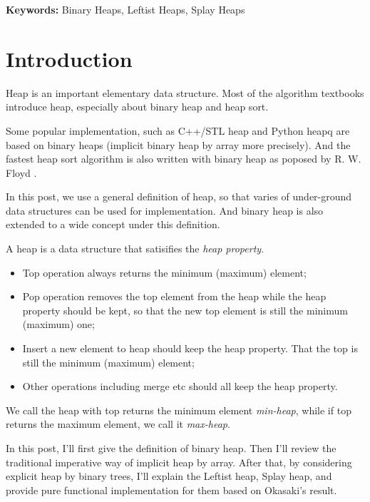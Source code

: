\documentclass{article}
\begin{document}
\vspace{3cm}
{\bfseries Keywords:} Binary Heaps, Leftist Heaps, Splay Heaps


\maketitle

\section{Introduction}
\label{introduction}

Heap is an important elementary data structure. Most of the algorithm
textbooks introduce heap, especially about binary heap and heap sort.

Some popular implementation, such as C++/STL heap and Python heapq
are based on binary heaps (implicit binary heap by array
more precisely). And the fastest heap sort algorithm is also
written with binary heap as poposed by R. W. Floyd
\cite{wiki-heapsort} \cite{rosetta-heapsort}.

In this post, we use a general definition of heap, so that
varies of under-ground data structures can be used for implementation.
And binary heap is also extended to a wide concept under this definition.

A heap is a data structure that satisifies the {\em heap property}.
\begin{itemize}
\item Top operation always returns the minimum (maximum) element;
\item Pop operation removes the top element from the heap while the heap
property should be kept, so that the new top element is still the 
minimum (maximum) one;
\item Insert a new element to heap should keep the heap property. That
the top is still the minimum (maximum) element;
\item Other operations including merge etc should all keep the heap property.
\end{itemize}

We call the heap with top returns the minimum element {\em min-heap},
while if top returns the maximum element, we call it {\em max-heap}.

In this post, I'll first give the definition of binary heap. Then
I'll review the traditional imperative way of implicit heap by array.
After that, by considering explicit heap by binary trees, I'll
explain the Leftist heap, Splay heap, and provide pure functional implementation
for them based on Okasaki's result\cite{okasaki-book}.
\end{document}
